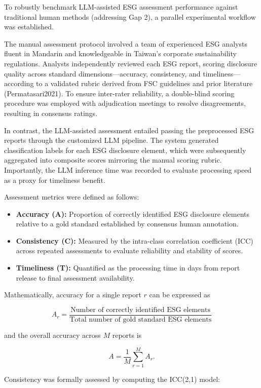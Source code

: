 \documentclass[
  12pt,
]{article}
\begin{document}
To robustly benchmark LLM-assisted ESG assessment performance against
traditional human methods (addressing Gap 2), a parallel experimental
workflow was established.

The manual assessment protocol involved a team of experienced ESG
analysts fluent in Mandarin and knowledgeable in Taiwan's corporate
sustainability regulations. Analysts independently reviewed each ESG
report, scoring disclosure quality across standard
dimensions---accuracy, consistency, and timeliness---according to a
validated rubric derived from FSC guidelines and prior literature
(Permatasari2021). To ensure inter-rater reliability, a double-blind
scoring procedure was employed with adjudication meetings to resolve
disagreements, resulting in consensus ratings.

In contrast, the LLM-assisted assessment entailed passing the
preprocessed ESG reports through the customized LLM pipeline. The system
generated classification labels for each ESG disclosure element, which
were subsequently aggregated into composite scores mirroring the manual
scoring rubric. Importantly, the LLM inference time was recorded to
evaluate processing speed as a proxy for timeliness benefit.

Assessment metrics were defined as follows:

\begin{itemize}
\item
  \textbf{Accuracy (A):} Proportion of correctly identified ESG
  disclosure elements relative to a gold standard established by
  consensus human annotation.
\item
  \textbf{Consistency (C):} Measured by the intra-class correlation
  coefficient (ICC) across repeated assessments to evaluate reliability
  and stability of scores.
\item
  \textbf{Timeliness (T):} Quantified as the processing time in days
  from report release to final assessment availability.
\end{itemize}

Mathematically, accuracy for a single report \(r\) can be expressed as

\[
A_r = \frac{\text{Number of correctly identified ESG elements}}{\text{Total number of gold standard ESG elements}}
\]

and the overall accuracy across \(M\) reports is

\[
A = \frac{1}{M} \sum_{r=1}^M A_r.
\]

Consistency was formally assessed by computing the ICC(2,1) model:
\end{document}
